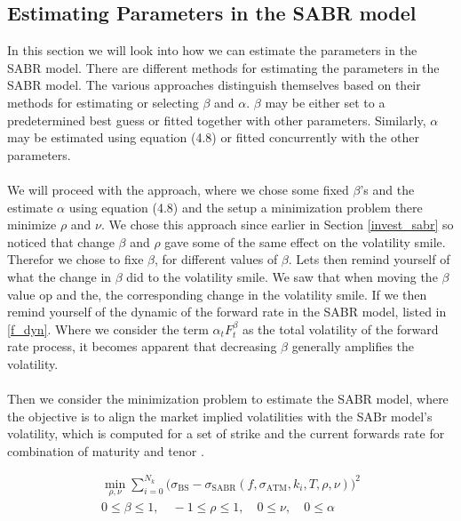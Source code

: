 \subsection{Estimating Parameters in the SABR model}
In this section we will look into how we can estimate the parameters in the SABR model. 
There are different methods for estimating the parameters in the SABR model. 
The various approaches distinguish themselves based on their methods for estimating or selecting $\beta$ and $\alpha$.
$\beta$ may be either set to a predetermined best guess or fitted together with other parameters.
Similarly, $\alpha$ may be estimated using equation (4.8) or fitted concurrently with the other parameters.
\\\\
We will proceed with the approach, where we chose some fixed $\beta$'s and the estimate $\alpha$ using equation (4.8) and the
setup a minimization problem there minimize $\rho$ and $\nu$. We chose this approach since earlier in Section \ref{invest_sabr}
so noticed that change $\beta$ and $\rho$ gave some of the same effect on the volatility smile. Therefor we chose to fixe  $\beta$, for different
values of $\beta$. Lets then remind yourself of what the change in $\beta$ did to the volatility smile.
We saw that when moving the $\beta$ value op and the, the corresponding change in the volatility smile. 
If we then remind yourself of the dynamic of the forward rate in the SABR model, listed in \autoref{f_dyn}. 
Where we consider the term  $\alpha_t F_t^\beta$ as the total volatility of the forward rate process,
it becomes apparent that decreasing $\beta$ generally amplifies the volatility.    
\\\\
Then we consider the minimization problem to estimate the SABR model, where the objective is to align
the market implied volatilities with the SABr model's volatility, which is computed for a 
set of strike and the current forwards rate for combination of maturity and tenor \cite{Lindstrom}.
 
\begin{align}
   \min_{\rho, \nu} \sum_{i=0}^{N_k} \Big(\sigma_{\text{BS}} - 
    \sigma_{\text{SABR}}(f, \sigma_{\text{ATM}}, k_i, T, \rho, \nu)\Big)^2 \\
    0 \leq \beta \leq 1, \quad -1 \leq \rho \leq 1, \quad 0 \leq \nu, \quad 0 \leq \alpha
\end{align}



